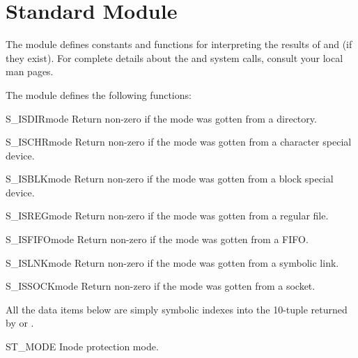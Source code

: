 
\section{Standard Module }
\label{module-stat}

The  module defines constants and functions for interpreting the
results of  and  (if they exist).
For complete details about the  and  system
calls, consult your local man pages.

The  module defines the following functions:


\begin{funcdesc}{S_ISDIR}{mode}
Return non-zero if the mode was gotten from a directory.
\end{funcdesc}

\begin{funcdesc}{S_ISCHR}{mode}
Return non-zero if the mode was gotten from a character special device.
\end{funcdesc}

\begin{funcdesc}{S_ISBLK}{mode}
Return non-zero if the mode was gotten from a block special device.
\end{funcdesc}

\begin{funcdesc}{S_ISREG}{mode}
Return non-zero if the mode was gotten from a regular file.
\end{funcdesc}

\begin{funcdesc}{S_ISFIFO}{mode}
Return non-zero if the mode was gotten from a FIFO.
\end{funcdesc}

\begin{funcdesc}{S_ISLNK}{mode}
Return non-zero if the mode was gotten from a symbolic link.
\end{funcdesc}

\begin{funcdesc}{S_ISSOCK}{mode}
Return non-zero if the mode was gotten from a socket.
\end{funcdesc}

All the data items below are simply symbolic indexes into the 10-tuple
returned by  or .  

\begin{datadesc}{ST_MODE}
Inode protection mode.
\end{datadesc}

